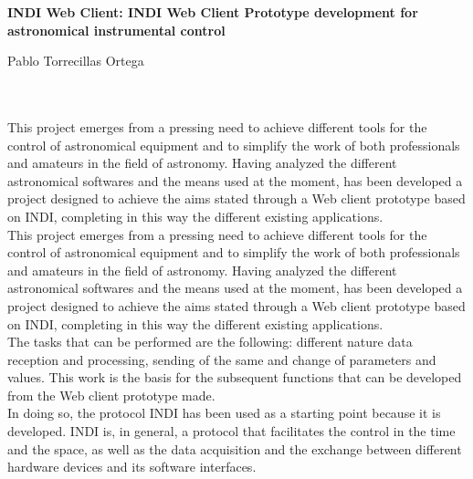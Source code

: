 \cleardoublepage


\thispagestyle{empty}


\begin{center}
{\large\bfseries INDI Web Client: INDI Web Client Prototype development for astronomical instrumental control}\\
\end{center}
\begin{center}
Pablo Torrecillas Ortega\\
\end{center}

\\

\vspace{0.7cm}
\\

This project emerges from a pressing need to achieve different tools for the control of astronomical equipment and to simplify the work of both professionals and amateurs in the field of astronomy. Having analyzed the different astronomical softwares and the means used at the moment, has been developed a project designed to achieve the aims stated through a Web client prototype based on INDI, completing in this way the different existing applications.\\

This project emerges from a pressing need to achieve different tools for the control of astronomical equipment and to simplify the work of both professionals and amateurs in the field of astronomy. Having analyzed the different astronomical softwares and the means used at the moment, has been developed a project designed to achieve the aims stated through a Web client prototype based on INDI, completing in this way the different existing applications.\\

The tasks that can be performed are the following: different nature data reception and processing, sending of the same and change of parameters and values. This work is the basis for the subsequent functions that can be developed from the Web client prototype made.\\

In doing so, the protocol INDI has been used as a starting point because it is developed. INDI is, in general, a protocol that facilitates the control in the time and the space, as well as the data acquisition and the exchange between different hardware devices and its software interfaces.\\

